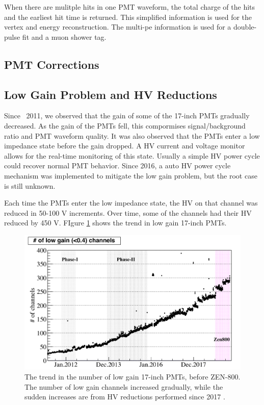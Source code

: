 When there are mulitple hits in one PMT waveform, the total charge of the hits and the earliest hit time is returned. This simplified information is used for the vertex and energy reconstruction. The multi-pe information is used for a double-pulse fit and a muon shower tag.

\subsection{PMT Corrections}
\subsection*{Low Gain Problem and HV Reductions}
Since ~2011, we observed that the gain of some of the 17-inch PMTs gradually decreased. As the gain of the PMTs fell, this compormises signal/background ratio and PMT waveform quality. It was also observed that the PMTs enter a low impedance state before the gain dropped. A HV current and voltage monitor allows for the real-time monitoring of this state. Usually a simple HV power cycle could recover normal PMT behavior. Since 2016, a auto HV power cycle mechanism was implemented to mitigate the low gain problem, but the root case is still unknown.

Each time the PMTs enter the low impedance state, the HV on that channel was reduced in 50-100 V increments. Over time, some of the channels had their HV reduced by 450 V. FIgure \ref{fig:lowgain_trend} shows the trend in low gain 17-inch PMTs.

\begin{figure}[htb]
	\centering
	\includegraphics[scale=0.3]{lowgain_trend.png}
	\caption{The trend in the number of low gain 17-inch PMTs, before ZEN-800. The number of low gain channels increased gradually, while the sudden increases are from HV reductions performed since 2017 \cite{ozaki_phd}.}
	\label{fig:lowgain_trend}
\end{figure}

